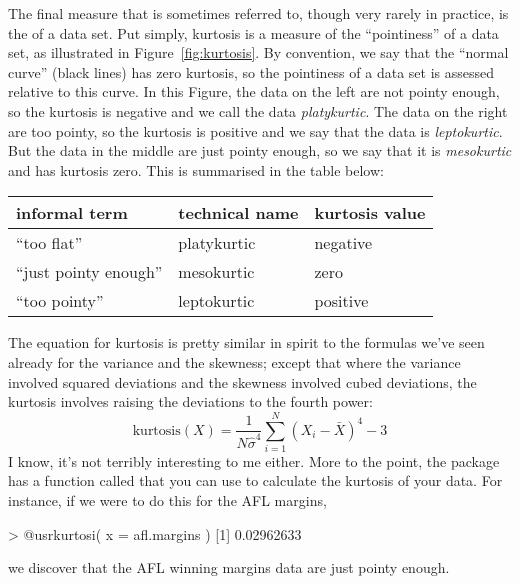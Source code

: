 The final measure that is sometimes referred to, though very rarely in practice, is the  of a data set. Put simply, kurtosis is a measure of the ``pointiness'' of a data set, as illustrated in Figure~\ref{fig:kurtosis}. By convention, we say that the ``normal curve'' (black lines) has zero kurtosis, so the pointiness of a data set is assessed relative to this curve. In this Figure, the data on the left are not pointy enough, so the kurtosis is negative and we call the data {\it platykurtic}. The data on the right are too pointy, so the kurtosis is positive and we say that the data is {\it leptokurtic}. But the data in the middle are just pointy enough, so we say that it is {\it mesokurtic} and has kurtosis zero. This is summarised in the table below:

\begin{center}
\begin{tabular}{lll}
informal term & technical name & kurtosis value \\ \hline
``too flat'' & platykurtic & negative \\
``just pointy enough'' & mesokurtic & zero \\
``too pointy'' & leptokurtic & positive 
\end{tabular}
\end{center}

The equation for kurtosis is pretty similar in spirit to the formulas we've seen already for the variance and the skewness; except that where the variance involved squared deviations and the skewness involved cubed deviations, the kurtosis involves raising the deviations to the fourth power:
$$
\mbox{kurtosis}(X) = \frac{1}{N \hat\sigma^4} \sum_{i=1}^N \left( X_i - \bar{X} \right)^4  - 3
$$
I know, it's not terribly interesting to me either. More to the point, the  package has a function called  that you can use to calculate the kurtosis of your data. For instance, if we were to do this for the AFL margins, 
\begin{rblock1}
> @usr{kurtosi( x = afl.margins )}
[1] 0.02962633
\end{rblock1}
we discover that the AFL winning margins data are just pointy enough.



